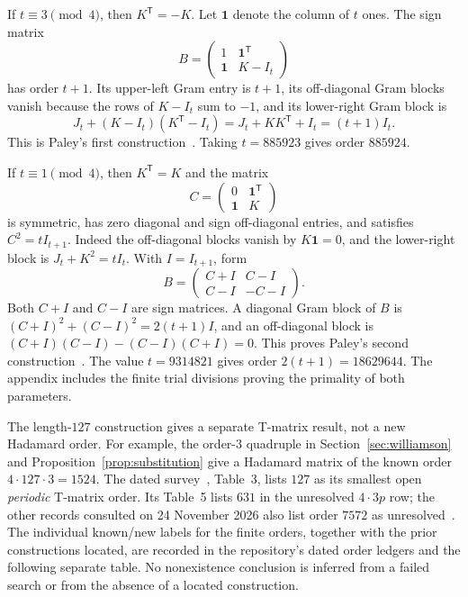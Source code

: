 \documentclass[10pt]{article}
\begin{document}
If $t\equiv3\pmod4$, then $K^{\mathsf T}=-K$.
Let $\mathbf1$ denote the column of $t$ ones. The sign matrix
\[
 B=\begin{pmatrix}1&\mathbf1^{\mathsf T}\\
                  \mathbf1&K-I_t\end{pmatrix}
\]
has order $t+1$. Its upper-left Gram entry is $t+1$, its off-diagonal
Gram blocks vanish because the rows of $K-I_t$ sum to $-1$, and its
lower-right Gram block is
\[
 J_t+(K-I_t)(K^{\mathsf T}-I_t)
 =J_t+KK^{\mathsf T}+I_t=(t+1)I_t.
\]
This is Paley's first construction~\cite{paley}. Taking $t=885923$ gives order $885924$.

If $t\equiv1\pmod4$, then $K^{\mathsf T}=K$ and the matrix
\[
 C=\begin{pmatrix}0&\mathbf1^{\mathsf T}\\\mathbf1&K\end{pmatrix}
\]
is symmetric, has zero diagonal and sign off-diagonal entries, and
satisfies $C^2=tI_{t+1}$. Indeed the off-diagonal blocks vanish by
$K\mathbf1=0$, and the lower-right block is
$J_t+K^2=tI_t$. With $I=I_{t+1}$, form
\[
 B=\begin{pmatrix}C+I&C-I\\C-I&-C-I\end{pmatrix}.
\]
Both $C+I$ and $C-I$ are sign matrices. A diagonal Gram block of $B$
is $(C+I)^2+(C-I)^2=2(t+1)I$, and an off-diagonal block is
$(C+I)(C-I)-(C-I)(C+I)=0$. This proves Paley's second construction~\cite{paley}.
The value $t=9314821$ gives order $2(t+1)=18629644$.
The appendix includes the finite trial divisions proving the primality
of both parameters.

The length-$127$ construction gives a separate T-matrix result, not a
new Hadamard order. For example, the order-$3$ quadruple in
Section~\ref{sec:williamson} and Proposition~\ref{prop:substitution}
give a Hadamard matrix of the known order $4\cdot127\cdot3=1524$.
The dated survey~\cite{survey}, Table~3, lists $127$ as its smallest open
\emph{periodic} T-matrix order. Its Table~5 lists $631$ in the unresolved
$4\cdot3p$ row; the other records consulted on 24 November 2026 also
list order $7572$ as unresolved~\cite{explorer,frontier}.
The individual known/new labels for the finite orders, together
with the prior constructions located, are recorded in the repository's
dated order ledgers and the following separate table. No nonexistence conclusion is inferred from a
failed search or from the absence of a located construction.
\end{document}
